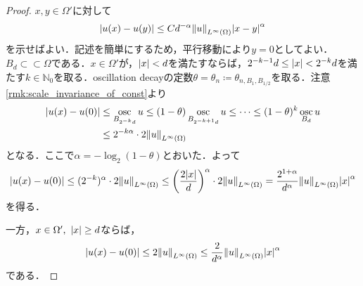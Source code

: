 \documentclass[a4paper]{ltjsarticle}
\newcommand{\Nset}{\mathbb{N}}
\newcommand{\Om}{\Omega}
\newcommand{\ssubset}{\subset\subset}
\newcommand{\1}{\mathbbm{1}}
\DeclareMathOperator*{\osc}{\mathrm{osc}}
\numberwithin{equation}{section}
\theoremstyle{definition}
\begin{document}
\begin{proof}
    $x,y\in \Om'$に対して
    \begin{equation}
        \abs{u(x)-u(y)}\leq Cd^{-\alpha}\norm{u}_{L^\infty(\Om)}\abs{x-y}^\alpha 
    \end{equation}
    を示せばよい．記述を簡単にするため，平行移動により$y=0$としてよい．
    $B_d\ssubset \Om$である．$x\in \Om'$が，$\abs{x}<d$を満たすならば，$2^{-k-1}d\leq \abs{x}<2^{-k}d$を満たす$k\in \Nset_{0}$を取る．oscillation decayの定数$\theta=\theta_n\coloneqq\theta_{n,B_1,B_{1/2}}$を取る．注意\ref{rmk:scale_invariance_of_const}より
    \begin{align}
        \abs{u(x)-u(0)}&\leq \osc_{B_{2^{-k}d}}u\leq (1-\theta)\osc_{B_{2^{-k+1}d}}u\leq\cdots\leq (1-\theta)^k\osc_{B_d}u\\
        &\leq 2^{-k\alpha}\cdot 2\norm{u}_{L^\infty(\Om)}
    \end{align}
    となる．ここで$\alpha=-\log_2(1-\theta)$とおいた．よって
    \begin{equation}
        \abs{u(x)-u(0)}\leq (2^{-k})^\alpha\cdot 2\norm{u}_{L^\infty(\Om)}\leq \qty(\frac{2\abs{x}}{d})^\alpha\cdot 2\norm{u}_{L^\infty(\Om)}=\frac{2^{1+\alpha}}{d^\alpha}\norm{u}_{L^\infty(\Om)}\abs{x}^\alpha
    \end{equation}
    を得る．

    一方，$x\in \Om',\ \abs{x}\geq d$ならば，
    \begin{equation}
        \abs{u(x)-u(0)}\leq 2\norm{u}_{L^\infty(\Om)}\leq \frac{2}{d^\alpha}\norm{u}_{L^\infty(\Om)}\abs{x}^\alpha 
    \end{equation}
    である．
\end{proof}
\end{document}
